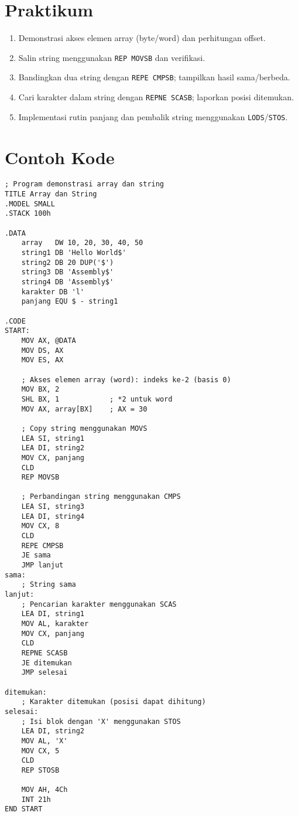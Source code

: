 \documentclass[../main.tex]{subfiles}
\begin{document}
\section{Praktikum}
\begin{enumerate}
  \item Demonstrasi akses elemen array (byte/word) dan perhitungan offset.
  \item Salin string menggunakan \texttt{REP MOVSB} dan verifikasi.
  \item Bandingkan dua string dengan \texttt{REPE CMPSB}; tampilkan hasil sama/berbeda.
  \item Cari karakter dalam string dengan \texttt{REPNE SCASB}; laporkan posisi ditemukan.
  \item Implementasi rutin panjang dan pembalik string menggunakan \texttt{LODS}/\texttt{STOS}.
\end{enumerate}

\section{Contoh Kode}
\begin{verbatim}
; Program demonstrasi array dan string
TITLE Array dan String
.MODEL SMALL
.STACK 100h

.DATA
    array   DW 10, 20, 30, 40, 50
    string1 DB 'Hello World$'
    string2 DB 20 DUP('$')
    string3 DB 'Assembly$'
    string4 DB 'Assembly$'
    karakter DB 'l'
    panjang EQU $ - string1

.CODE
START:
    MOV AX, @DATA
    MOV DS, AX
    MOV ES, AX
    
    ; Akses elemen array (word): indeks ke-2 (basis 0)
    MOV BX, 2
    SHL BX, 1            ; *2 untuk word
    MOV AX, array[BX]    ; AX = 30
    
    ; Copy string menggunakan MOVS
    LEA SI, string1
    LEA DI, string2
    MOV CX, panjang
    CLD
    REP MOVSB
    
    ; Perbandingan string menggunakan CMPS
    LEA SI, string3
    LEA DI, string4
    MOV CX, 8
    CLD
    REPE CMPSB
    JE sama
    JMP lanjut
sama:
    ; String sama
lanjut:
    ; Pencarian karakter menggunakan SCAS
    LEA DI, string1
    MOV AL, karakter
    MOV CX, panjang
    CLD
    REPNE SCASB
    JE ditemukan
    JMP selesai

ditemukan:
    ; Karakter ditemukan (posisi dapat dihitung)
selesai:
    ; Isi blok dengan 'X' menggunakan STOS
    LEA DI, string2
    MOV AL, 'X'
    MOV CX, 5
    CLD
    REP STOSB
    
    MOV AH, 4Ch
    INT 21h
END START
\end{verbatim}
\end{document}
